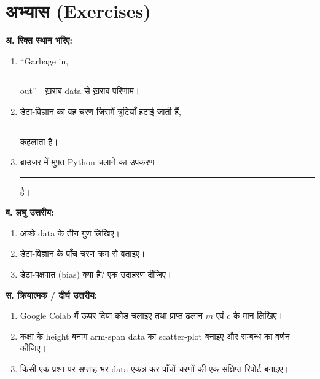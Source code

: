 \section*{अभ्यास (Exercises)}
\textbf{अ. रिक्त स्थान भरिए:}
\begin{enumerate}[leftmargin=1.6em]
  \item “Garbage in, \rule{2.8cm}{0.4pt} out” - ख़राब data से ख़राब परिणाम।
  \item डेटा-विज्ञान का वह चरण जिसमें त्रुटियाँ हटाई जाती हैं, \rule{2.8cm}{0.4pt} कहलाता है।
  \item ब्राउज़र में मुफ़्त Python चलाने का उपकरण \rule{2.8cm}{0.4pt} है।
\end{enumerate}

\textbf{ब. लघु उत्तरीय:}
\begin{enumerate}[leftmargin=1.6em]
  \item अच्छे data के तीन गुण लिखिए।
  \item डेटा-विज्ञान के पाँच चरण क्रम से बताइए।
  \item डेटा-पक्षपात (bias) क्या है? एक उदाहरण दीजिए।
\end{enumerate}

\textbf{स. क्रियात्मक / दीर्घ उत्तरीय:}
\begin{enumerate}[leftmargin=1.6em]
  \item Google Colab में ऊपर दिया कोड चलाइए तथा प्राप्त ढलान $m$ एवं $c$ के मान लिखिए।
  \item कक्षा के height बनाम arm-span data का scatter-plot बनाइए और सम्बन्ध का वर्णन कीजिए।
  \item किसी एक प्रश्न पर सप्ताह-भर data एकत्र कर पाँचों चरणों की एक संक्षिप्त रिपोर्ट
        बनाइए।
\end{enumerate}


